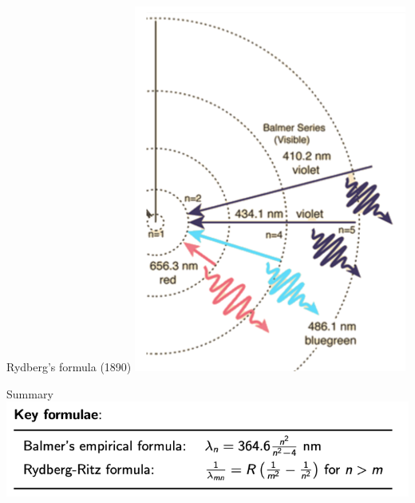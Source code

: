  \begin{frame}{Rydberg's formula (1890)}
\small
\includegraphics[scale=0.35]{spec8}

\end{frame}

%

 \begin{frame}{Summary}
\small
\includegraphics[scale=0.3]{spec10}

\end{frame}

 \begin{frame}{}

\end{frame}


